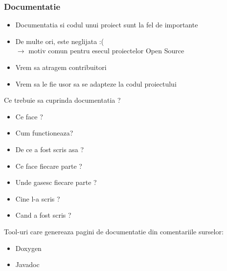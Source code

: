 \documentclass{beamer}
\begin{document}
  \begin{frame}[allowframebreaks]
  \frametitle{Documentatie}
  \begin{itemize}
  \item Documentatia si codul unui proiect sunt la fel de importante
  \item De multe ori, este neglijata :( \\ $\rightarrow$ motiv comun pentru esecul proiectelor Open Source \\ \vspace{1.5cm}
  \item Vrem sa atragem contribuitori
  \item Vrem sa le fie usor sa se adapteze la codul proiectului
  \end{itemize}
  \framebreak
  Ce trebuie sa cuprinda documentatia ?\\
  \begin{itemize}
  \item Ce face ?
  \item Cum functioneaza?
  \item De ce a fost scris asa ?
  \item Ce face fiecare parte ?
  \item Unde gasesc fiecare parte ?
  \item Cine l-a scris ?
  \item Cand a fost scris ?
  \end{itemize}
  \vspace{0.5cm}
  Tool-uri care genereaza pagini de documentatie din comentariile surselor:\\
  \begin{itemize}
  \item Doxygen
  \item Javadoc
  \end{itemize}
  \end{frame}
\end{document}
